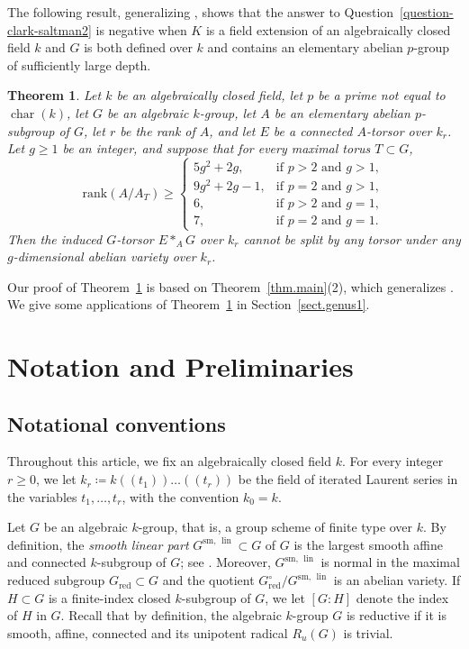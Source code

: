 \documentclass[12pt]{amsart}
\numberwithin{equation}{section}
\newtheorem{theorem}{Theorem}[section]
\theoremstyle{remark}
\newcommand{\lin}{\operatorname{lin}}
\newcommand{\Glin}{G^{\mathrm{sm}, \, \lin}}
\begin{document}
 The following result, generalizing \cite[Theorem 1.2]{genus1}, shows that the answer to Question~\ref{question-clark-saltman2} is negative when $K$ is a field extension of an algebraically closed field $k$ and $G$ is both defined over $k$ and contains an elementary abelian $p$-group of sufficiently large depth.
 
\begin{theorem}\label{thm.non-toral-obstruction}
Let $k$ be an algebraically closed field, let $p$ be a prime not equal to
$\operatorname{char}(k)$, let $G$ be an algebraic $k$-group, let $A$ be an elementary abelian $p$-subgroup of $G$, let $r$ be the rank of $A$, and let $E$ be a connected $A$-torsor over $k_r$. Let $g\geqslant 1$ be an integer, and suppose that for every maximal torus $T\subset G$,
\[
        \mathrm{rank}(A/A_T) \geqslant 
        \begin{cases}
        5g^2+2g, & \text{if } p>2 \text{ and } g>1,\\[2mm]
        9g^2+2g-1, & \text{if } p=2 \text{ and } g>1,\\[2mm]
        6, & \text{if } p>2 \text{ and } g=1,\\[2mm]
        7, & \text{if } p=2 \text{ and } g=1.
        \end{cases}
\]
Then the induced $G$-torsor $E*_AG$ over $k_r$ cannot be split by any torsor under any $g$-dimensional abelian variety over $k_r$.
\end{theorem}

Our proof of Theorem~\ref{thm.non-toral-obstruction} is based on Theorem~\ref{thm.main}(2), which generalizes \cite[Proposition 2.1]{genus1}. We give some applications of Theorem~\ref{thm.non-toral-obstruction} in Section~\ref{sect.genus1}.

\section{Notation and Preliminaries}
\label{sect.prelim} 

\subsection{Notational conventions}
\label{subsect.notation}
Throughout this article, we fix an algebraically closed field $k$. For every integer $r\geqslant 0$, we let $k_r \coloneqq k(\!(t_1)\!)\dots (\!(t_r)\!)$ be the field of iterated Laurent series in the variables $t_1, \ldots, t_r$, with the convention $k_0=k$.

Let $G$ be an algebraic $k$-group, that is, a group scheme of finite type over $k$. By definition, the \emph{smooth linear part} $\Glin\subset G$ of $G$ is the largest smooth affine and connected $k$-subgroup of $G$; see \cite[Section 2.1]{bouthier2025generically}. Moreover, $\Glin$ is normal in the maximal reduced subgroup $G_{\mathrm{red}} \subset G$ and the quotient $G_{\mathrm{red}}^{\circ}/\Glin$ is an abelian variety. If $H\subset G$ is a finite-index closed $k$-subgroup of $G$, we let $[G:H]$ denote the index of $H$ in $G$. Recall that by definition, the algebraic $k$-group $G$ is reductive if it is smooth, affine, connected and its unipotent radical $R_u(G)$ is trivial.
\end{document}
